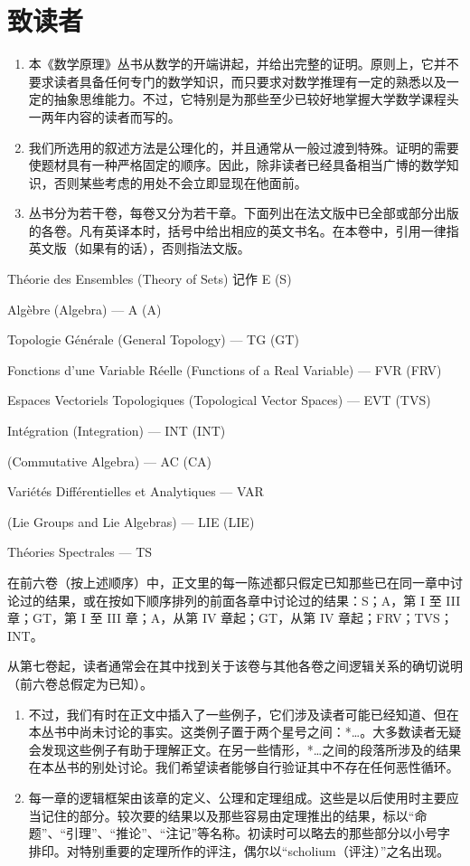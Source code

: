 \chapter*{致读者}
{}

\begin{enumerate}
\def\labelenumi{\arabic{enumi}.}
\item
  本《数学原理》丛书从数学的开端讲起，并给出完整的证明。原则上，它并不要求读者具备任何专门的数学知识，而只要求对数学推理有一定的熟悉以及一定的抽象思维能力。不过，它特别是为那些至少已较好地掌握大学数学课程头一两年内容的读者而写的。
\item
  我们所选用的叙述方法是公理化的，并且通常从一般过渡到特殊。证明的需要使题材具有一种严格固定的顺序。因此，除非读者已经具备相当广博的数学知识，否则某些考虑的用处不会立即显现在他面前。
\item
  丛书分为若干卷，每卷又分为若干章。下面列出在法文版中已全部或部分出版的各卷。凡有英译本时，括号中给出相应的英文书名。在本卷中，引用一律指英文版（如果有的话），否则指法文版。
\end{enumerate}

Théorie des Ensembles (Theory of Sets) 记作 E (S)

Algèbre (Algebra) --- A (A)

Topologie Générale (General Topology) --- TG (GT)

Fonctions d'une Variable Réelle (Functions of a Real Variable) --- FVR (FRV)

Espaces Vectoriels Topologiques (Topological Vector Spaces) --- EVT (TVS)

Intégration (Integration) --- INT (INT)

(Commutative Algebra) --- AC (CA)

Variétés Différentielles et Analytiques --- VAR

(Lie Groups and Lie Algebras) --- LIE (LIE)

Théories Spectrales --- TS

在前六卷（按上述顺序）中，正文里的每一陈述都只假定已知那些已在同一章中讨论过的结果，或在按如下顺序排列的前面各章中讨论过的结果：S；A，第 I 至 III 章；GT，第 I 至 III 章；A，从第 IV 章起；GT，从第 IV 章起；FRV；TVS；INT。

从第七卷起，读者通常会在其中找到关于该卷与其他各卷之间逻辑关系的确切说明（前六卷总假定为已知）。

\begin{enumerate}
\def\labelenumi{\arabic{enumi}.}
\setcounter{enumi}{3}
\item
  不过，我们有时在正文中插入了一些例子，它们涉及读者可能已经知道、但在本丛书中尚未讨论的事实。这类例子置于两个星号之间：*\ldots*。大多数读者无疑会发现这些例子有助于理解正文。在另一些情形，*\ldots* 之间的段落所涉及的结果在本丛书的别处讨论。我们希望读者能够自行验证其中不存在任何恶性循环。
\item
  每一章的逻辑框架由该章的定义、公理和定理组成。这些是以后使用时主要应当记住的部分。较次要的结果以及那些容易由定理推出的结果，标以“命题”、“引理”、“推论”、“注记”等名称。初读时可以略去的那些部分以小号字排印。对特别重要的定理所作的评注，偶尔以“scholium（评注）”之名出现。
\end{enumerate}

